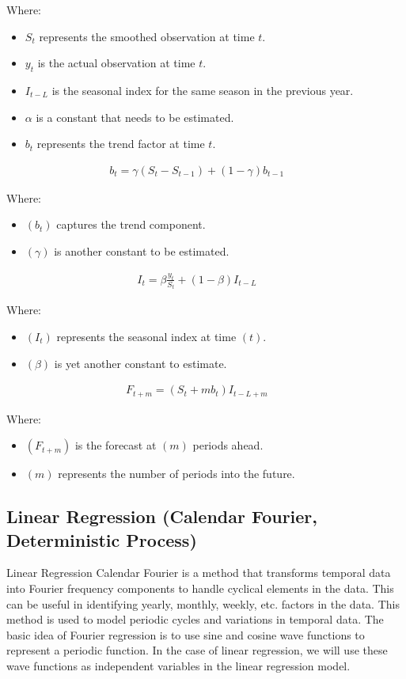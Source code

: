 \documentclass[conference]{IEEEtran}
\begin{document}
Where:
\begin{itemize}
\item $S_t$ represents the smoothed observation at time $t$.
\item $y_t$ is the actual observation at time $t$.
\item $I_{t-L}$ is the seasonal index for the same season in the previous year.
\item $\alpha$ is a constant that needs to be estimated.
\item $b_t$ represents the trend factor at time $t$.
\end{itemize}
\begin{align*}
b_t = \gamma (S_t - S_{t-1}) + (1 - \gamma)b_{t-1} & &
\end{align*}

Where:
\begin{itemize}
\item $(b_t)$ captures the trend component.
\item $(\gamma)$ is another constant to be estimated.
\end{itemize}
\begin{align*}
 I_t = \beta \frac{y_t}{S_t} + (1 - \beta) I_{t-L} & &
\end{align*}

Where:
\begin{itemize}
\item $(I_t)$ represents the seasonal index at time $(t)$.
\item $(\beta)$ is yet another constant to estimate.
\end{itemize}
\begin{align*}
F_{t+m} = (S_t + m b_t) I_{t-L+m} & &
\end{align*}

Where:
\begin{itemize}
\item $(F_{t+m})$ is the forecast at $(m)$ periods ahead.
\item $(m)$ represents the number of periods into the future.
\end{itemize}


\subsection{Linear Regression (Calendar Fourier, Deterministic Process)}
Linear Regression Calendar Fourier is a method that transforms temporal data into Fourier frequency components to handle cyclical elements in the data. This can be useful in identifying yearly, monthly, weekly, etc. factors in the data. This method is used to model periodic cycles and variations in temporal data. The basic idea of Fourier regression is to use sine and cosine wave functions to represent a periodic function. In the case of linear regression, we will use these wave functions as independent variables in the linear regression model. \cite{FourierTimeSeries}
\end{document}
